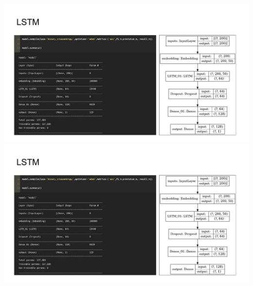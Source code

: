 \newpage
\includegraphics[page=4,width=1.1\textwidth,left]{Appendices/code_appendix.pdf}
\newline
\newline
\includegraphics[page=5,width=1.1\textwidth,left]{Appendices/code_appendix.pdf}